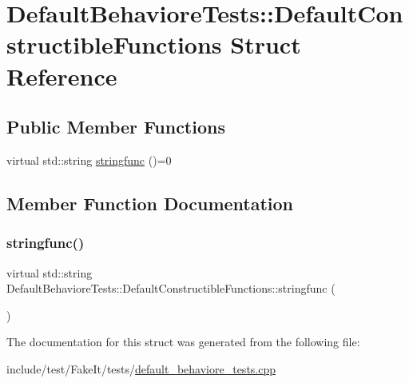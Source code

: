 \hypertarget{structDefaultBehavioreTests_1_1DefaultConstructibleFunctions}{}\section{Default\+Behaviore\+Tests\+::Default\+Constructible\+Functions Struct Reference}
\label{structDefaultBehavioreTests_1_1DefaultConstructibleFunctions}
\subsection*{Public Member Functions}
\begin{DoxyCompactItemize}
\item 
virtual std\+::string \mbox{\hyperlink{structDefaultBehavioreTests_1_1DefaultConstructibleFunctions_a20dfd19261004a8ca26c37865ebdbb41}{stringfunc}} ()=0
\end{DoxyCompactItemize}


\subsection{Member Function Documentation}
\mbox{\label{structDefaultBehavioreTests_1_1DefaultConstructibleFunctions_a20dfd19261004a8ca26c37865ebdbb41}} 
\subsubsection{\texorpdfstring{stringfunc()}{stringfunc()}}
{\footnotesize\ttfamily virtual std\+::string Default\+Behaviore\+Tests\+::\+Default\+Constructible\+Functions\+::stringfunc (\begin{DoxyParamCaption}{ }\end{DoxyParamCaption})\hspace{0.3cm}{\ttfamily [pure virtual]}}



The documentation for this struct was generated from the following file\+:\begin{DoxyCompactItemize}
\item 
include/test/\+Fake\+It/tests/\mbox{\hyperlink{default__behaviore__tests_8cpp}{default\+\_\+behaviore\+\_\+tests.\+cpp}}\end{DoxyCompactItemize}
